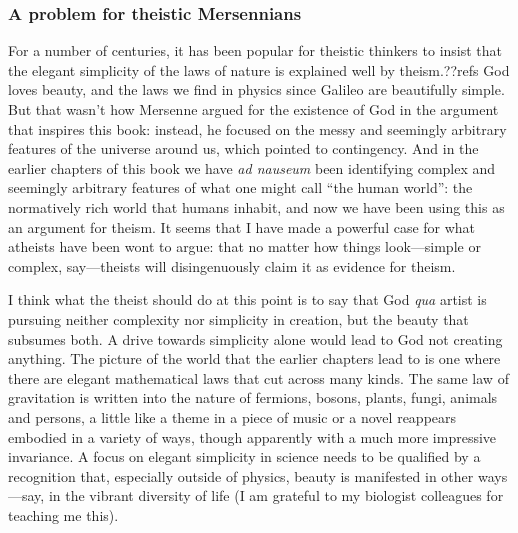 \subsubsection{A problem for theistic Mersennians}
For a number of centuries, it has been popular for theistic thinkers to insist that the elegant simplicity of the laws of nature 
is explained well by theism.??refs God loves beauty, and the laws we find in physics since Galileo are beautifully simple.
But that wasn't how Mersenne argued for the existence of God in the argument that inspires this book: 
instead, he focused on the messy and seemingly arbitrary features of the universe
around us, which pointed to contingency. And in the earlier chapters of this book we have 
\textit{ad nauseum} been identifying complex and seemingly arbitrary features of what one might call ``the human world'': 
the normatively rich world that humans inhabit, and now we have been using this as an argument for theism. It seems that I have made a powerful case for what atheists have been wont to argue: that no matter how things look---simple or complex, say---theists will disingenuously claim it as evidence for theism.

I think what the theist should do at this point is to say that God \textit{qua} artist is pursuing neither complexity nor simplicity 
in creation, but the beauty that subsumes both. A drive towards simplicity alone would lead to God not creating anything. 
The picture of the world that the earlier chapters lead to is one where there 
are elegant mathematical laws that cut across many kinds. The same law of gravitation is written into the nature of fermions, bosons, plants, fungi, animals and persons, a little like a theme in a piece of music or a novel reappears embodied in a variety 
of ways, though apparently with a much more impressive invariance. A focus on elegant simplicity in science needs to be qualified 
by a recognition that, especially outside of physics, beauty is manifested in other ways---say, in the vibrant diversity of 
life (I am grateful to my biologist colleagues for teaching me this). 

